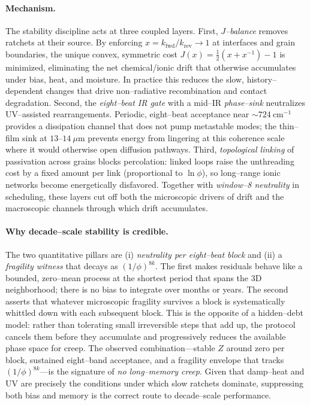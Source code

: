 \documentclass[12pt]{article}
\begin{document}
\paragraph{Mechanism.}
The stability discipline acts at three coupled layers. First, \emph{$J$–balance} removes ratchets at their source. By enforcing $x=k_{\mathrm{fwd}}/k_{\mathrm{rev}}\to 1$ at interfaces and grain boundaries, the unique convex, symmetric cost $J(x)=\tfrac12(x+x^{-1})-1$ is minimized, eliminating the net chemical/ionic drift that otherwise accumulates under bias, heat, and moisture. In practice this reduces the slow, history–dependent changes that drive non–radiative recombination and contact degradation. Second, the \emph{eight–beat IR gate} with a mid–IR \emph{phase–sink} neutralizes UV–assisted rearrangements. Periodic, eight–beat acceptance near $\sim 724~\mathrm{cm}^{-1}$ provides a dissipation channel that does not pump metastable modes; the thin–film sink at $13$–$14~\mu\mathrm{m}$ prevents energy from lingering at this coherence scale where it would otherwise open diffusion pathways. Third, \emph{topological linking} of passivation across grains blocks percolation: linked loops raise the unthreading cost by a fixed amount per link (proportional to $\ln\phi$), so long–range ionic networks become energetically disfavored. Together with \emph{window–8 neutrality} in scheduling, these layers cut off both the microscopic drivers of drift and the macroscopic channels through which drift accumulates.

\paragraph{Why decade–scale stability is credible.}
The two quantitative pillars are (i) \emph{neutrality per eight–beat block} and (ii) a \emph{fragility witness} that decays as $(1/\phi)^{8k}$. The first makes residuals behave like a bounded, zero–mean process at the shortest period that spans the 3D neighborhood; there is no bias to integrate over months or years. The second asserts that whatever microscopic fragility survives a block is systematically whittled down with each subsequent block. This is the opposite of a hidden–debt model: rather than tolerating small irreversible steps that add up, the protocol cancels them before they accumulate and progressively reduces the available phase space for creep. The observed combination—stable $Z$ around zero per block, sustained eight–band acceptance, and a fragility envelope that tracks $(1/\phi)^{8k}$—is the signature of \emph{no long–memory creep}. Given that damp–heat and UV are precisely the conditions under which slow ratchets dominate, suppressing both bias and memory is the correct route to decade–scale performance.
\end{document}
